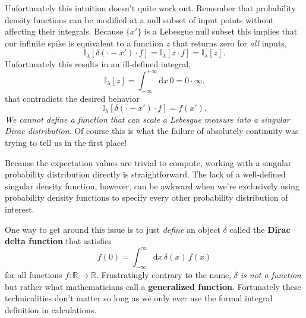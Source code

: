 \documentclass[
  letterpaper,
  DIV=11,
  numbers=noendperiod]{scrartcl}
\begin{document}
Unfortunately this intuition doesn't quite work out. Remember that
probability density functions can be modified at a null subset of input
points without affecting their integrals. Because \(\{ x' \}\) is a
Lebesgue null subset this implies that our infinite spike is equivalent
to a function \(z\) that returns zero for \emph{all} inputs, \[
\mathbb{I}_{\lambda} [ \delta(\cdot - x') \cdot f]
=
\mathbb{I}_{\lambda} [ z \cdot f]
=
\mathbb{I}_{\lambda} [ z ].
\] Unfortunately this results in an ill-defined integral, \[
\mathbb{I}_{\lambda} [ z ]
= \int_{-\infty}^{+\infty} \mathrm{d} x \, 0
= 0 \cdot \infty.
\] that contradicts the desired behavior \[
\mathbb{I}_{\lambda} [ \delta(\cdot - x') \cdot f] = f(x').
\] \emph{We cannot define a function that can scale a Lebesgue measure
into a singular Dirac distribution}. Of course this is what the failure
of absolutely continuity was trying to tell us in the first place!

Because the expectation values are trivial to compute, working with a
singular probability distribution directly is straightforward. The lack
of a well-defined singular density function, however, can be awkward
when we're exclusively using probability density functions to specify
every other probability distribution of interest.

One way to get around this issue is to just \emph{define} an object
\(\delta\) called the \textbf{Dirac delta function} that satisfies \[
f(0)
= \int_{-\infty}^{\infty} \mathrm{d} x \, \delta(x) \, f(x)
\] for all functions \(f : \mathbb{R} \rightarrow \mathbb{R}\).
Frustratingly contrary to the name, \(\delta\) \emph{is not a function}
but rather what mathematicians call a \textbf{generalized function}.
Fortunately these technicalities don't matter so long as we only ever
use the formal integral definition in calculations.
\end{document}
